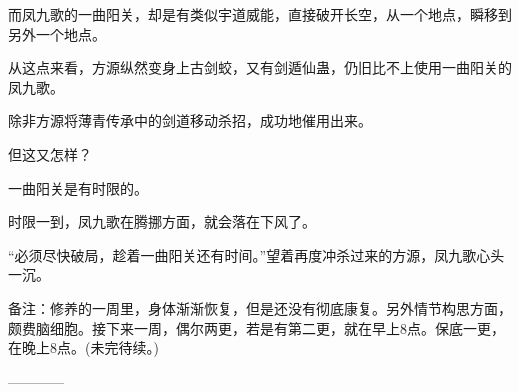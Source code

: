 \begin{this_body}
而凤九歌的一曲阳关，却是有类似宇道威能，直接破开长空，从一个地点，瞬移到另外一个地点。

从这点来看，方源纵然变身上古剑蛟，又有剑遁仙蛊，仍旧比不上使用一曲阳关的凤九歌。

除非方源将薄青传承中的剑道移动杀招，成功地催用出来。

但这又怎样？

一曲阳关是有时限的。

时限一到，凤九歌在腾挪方面，就会落在下风了。

“必须尽快破局，趁着一曲阳关还有时间。”望着再度冲杀过来的方源，凤九歌心头一沉。

备注：修养的一周里，身体渐渐恢复，但是还没有彻底康复。另外情节构思方面，颇费脑细胞。接下来一周，偶尔两更，若是有第二更，就在早上8点。保底一更，在晚上8点。(未完待续。)

------------

\end{this_body}

